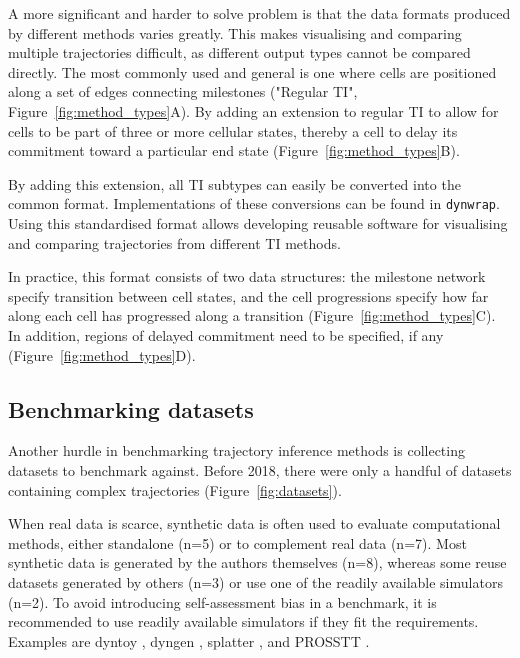 A more significant and harder to solve problem is that the data formats produced by different methods varies greatly. This makes visualising and comparing multiple trajectories difficult, as different output types cannot be compared directly. The most commonly used and general is one where cells are positioned along a set of edges connecting milestones ("Regular TI", Figure~\ref{fig:method_types}A). 
By adding an extension to regular TI to allow for cells to be part of three or more cellular states, thereby a cell to delay its commitment toward a particular end state (Figure~\ref{fig:method_types}B). 

By adding this extension, all TI subtypes can easily be converted into the common format. Implementations of these conversions can be found in \texttt{dynwrap}\cite{dyno}. Using this standardised format allows developing reusable software for visualising and comparing trajectories from different TI methods.

In practice, this format consists of two data structures: the milestone network specify transition between cell states, and the cell progressions specify how far along each cell has progressed along a transition (Figure~\ref{fig:method_types}C). In addition, regions of delayed commitment need to be specified, if any (Figure~\ref{fig:method_types}D). 


\subsection{Benchmarking datasets}
Another hurdle in benchmarking trajectory inference methods is collecting datasets to benchmark against. Before 2018, there were only a handful of datasets containing complex trajectories (Figure~\ref{fig:datasets}). 

When real data is scarce, synthetic data is often used to evaluate computational methods, either standalone (n=5) or to complement real data (n=7). Most synthetic data is generated by the authors themselves (n=8), whereas some reuse datasets generated by others (n=3) or use one of the readily available simulators (n=2). To avoid introducing self-assessment bias in a benchmark, it is recommended to use readily available simulators if they fit the requirements. Examples are dyntoy \cite{saelens_comparisonsinglecelltrajectory_2019}, dyngen \cite{dyngen}, splatter \cite{zappia_splattersimulationsinglecell_2017}, and PROSSTT \cite{papadopoulos_prossttprobabilisticsimulation_2018}.

